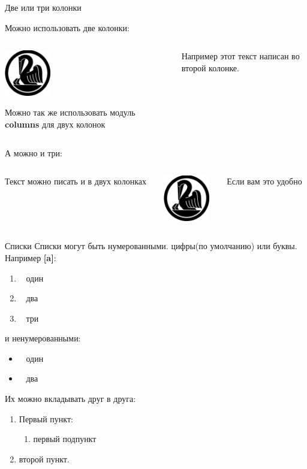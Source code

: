 \begin{frame}{Две или три колонки}

	Можно использовать две колонки:
	\begin{columns}
		\begin{column}{0.5\textwidth}
			\includegraphics[width=2cm]{../pic/kib_old_logo.png}
			
			Можно так же использовать модуль \textbf{columns}
			для двух колонок
		\end{column}
		\begin{column}{0.5\textwidth}
			Например этот текст написан во второй колонке.
		\end{column}
	\end{columns}

	А можно и три:
	\begin{columns}
		\begin{column}{0.33\textwidth}
			Текст можно писать и в двух колонках
		\end{column}
		\begin{column}{0.33\textwidth}
			\centering
			\includegraphics[width=2cm]{../pic/kib_old_logo.png}
		\end{column}
		\begin{column}{0.33\textwidth}
			Если вам это удобно
		\end{column}
	\end{columns}
	
	
\end{frame}


\begin{frame}{Списки}
	Списки могут быть нумерованными. цифры(по умолчанию) или буквы. Например \textbf{[a]}:
	\begin{enumerate}[a]
		\item~ один
		\item~ два
		\item~ три
	\end{enumerate}
	и ненумерованными:
	\begin{itemize}
		\item~ один
		\item~ два
	\end{itemize}
	Их можно вкладывать друг в друга:
	\begin{enumerate}
		\item Первый пункт:
		\begin{enumerate}
			\item первый подпункт
		\end{enumerate}
		\item второй пункт.
	\end{enumerate}
\end{frame}

